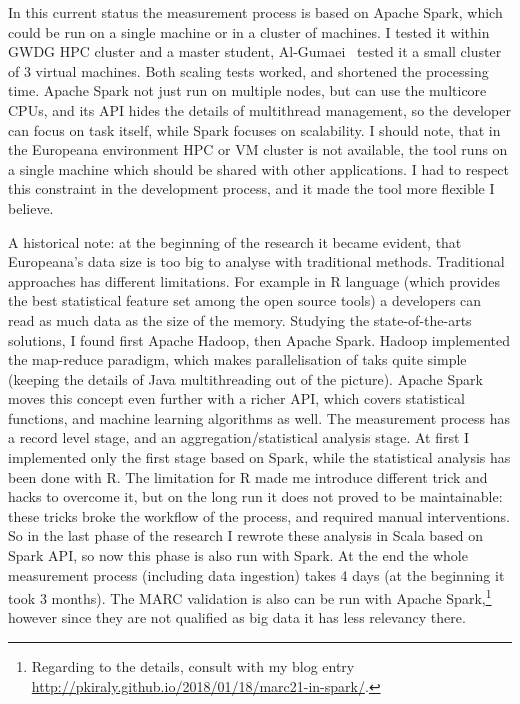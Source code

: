 In this current status the measurement process is based on Apache Spark, which could be run on a single machine or in a cluster of machines. I tested it within GWDG HPC cluster and a master student, Al-Gumaei~\cite{al-gumaei2016} tested it a small cluster of 3 virtual machines. Both scaling tests worked, and shortened the processing time. Apache Spark not just run on multiple nodes, but can use the multicore CPUs, and its API hides the details of multithread management, so the developer can focus on task itself, while Spark focuses on scalability. I should note, that in the Europeana environment HPC or VM cluster is not available, the tool runs on a single machine which should be shared with other applications. I had to respect this constraint in the development process, and it made the tool more flexible I believe.

A historical note: at the beginning of the research it became evident, that Europeana's data size is too big to analyse with traditional methods. Traditional approaches has different limitations. For example in R language (which provides the best statistical feature set among the open source tools) a developers can read as much data as the size of the memory. Studying the state-of-the-arts solutions, I found first Apache Hadoop, then Apache Spark. Hadoop implemented the map-reduce paradigm, which makes parallelisation of taks quite simple (keeping the details of Java multithreading out of the picture). Apache Spark moves this concept even further with a richer API, which covers statistical functions, and machine learning algorithms as well. The measurement process has a record level stage, and an aggregation/statistical analysis stage. At first I implemented only the first stage based on Spark, while the statistical analysis has been done with R. The limitation for R made me introduce different trick and hacks to overcome it, but on the long run it does not proved to be maintainable: these tricks broke the workflow of the process, and required manual interventions. So in the last phase of the research I rewrote these analysis in Scala based on Spark API, so now this phase is also run with Spark. At the end the whole measurement process (including data ingestion) takes 4 days (at the beginning it took 3 months). The MARC validation is also can be run with Apache Spark,\footnote{Regarding to the details, consult with my blog entry \url{http://pkiraly.github.io/2018/01/18/marc21-in-spark/}.} however since they are not qualified as big data it has less relevancy there.

